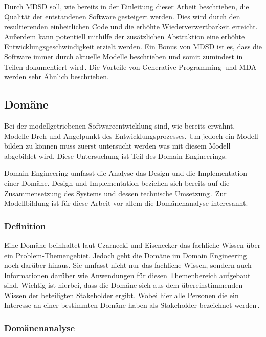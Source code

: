 \documentclass[12pt,oneside,a4paper,parskip]{scrbook}
\begin{document}
Durch MDSD soll, wie bereits in der Einleitung dieser Arbeit beschrieben, die Qualität der entstandenen Software gesteigert werden. Dies wird durch den resultierenden einheitlichen Code und die erhöhte Wiederverwertbarkeit erreicht. Außerdem kann potentiell mithilfe der zusätzlichen Abstraktion eine erhöhte Entwicklungsgeschwindigkeit erzielt werden. Ein Bonus von MDSD ist es, dass die Software immer durch aktuelle Modelle beschrieben und somit zumindest in Teilen dokumentiert wird\,\cite[S. 13ff.]{stahl2007}. Die Vorteile von Generative Programming\,\cite[S. 13ff.]{czaeis2000} und MDA\,\cite{mdaguide} werden sehr Ähnlich beschrieben.

\subsection{Domäne}

Bei der modellgetriebenen Softwareentwicklung sind, wie bereits erwähnt, Modelle Dreh und Angelpunkt des Entwicklungsprozesses. Um jedoch ein Modell bilden zu können muss zuerst untersucht werden was mit diesem Modell abgebildet wird. Diese Untersuchung ist Teil des Domain Engineerings.

Domain Engineering umfasst die Analyse das Design und die Implementation einer Domäne. Design und Implementation beziehen sich bereits auf die Zusammensetzung des Systems und dessen technische Umsetzung\,\cite[S. 21f.]{czaeis2000}. Zur Modellbildung ist für diese Arbeit vor allem die Domänenanalyse interesannt.

\subsubsection{Definition}

Eine Domäne beinhaltet laut Czarnecki und Eisenecker das fachliche Wissen über ein Problem-Themengebiet. Jedoch geht die Domäne im Domain Engineering noch darüber hinaus. Sie umfasst nicht nur das fachliche Wissen, sondern auch Informationen darüber wie Anwendungen für diesen Themenbereich aufgebaut sind. Wichtig ist hierbei, dass die Domäne sich aus dem übereinstimmenden Wissen der beteiligten Stakeholder ergibt. Wobei hier alle Personen die ein Interesse an einer bestimmten Domäne haben als Stakeholder bezeichnet werden\,\cite[S. 33]{czaeis2000}.

\subsubsection{Domänenanalyse}
\end{document}
